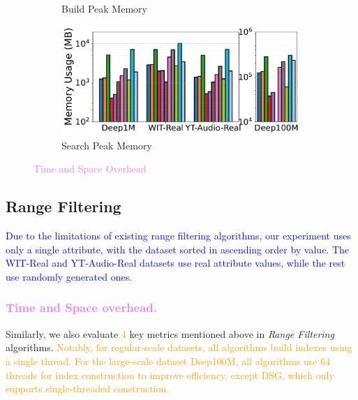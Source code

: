 \documentclass[sigconf, nonacm]{acmart}
\begin{document}
{\begin{figure}[t]
\begin{subfigure}[t]{0.495\columnwidth}
			\caption{\footnotesize Build Peak Memory}
			\label{fig:rangeFilter_build_memory_mb}
		\end{subfigure}
		\hfill
		\begin{subfigure}[t]{0.495\columnwidth}
			\centering
			\includegraphics[width=\linewidth]{figures/searchMem/range_memory_comparison.pdf}
			\caption{\footnotesize Search Peak Memory}
			\label{fig:rangeFilter_search_memory_mb}
		\end{subfigure}
		
		\caption{\textcolor{violet}{Time and Space Overhead}}
		\label{fig:rangeFilter_build_index_comparison}
	\end{figure}
	\subsection{Range Filtering}
	\textcolor{blue}{Due to the limitations of existing range filtering algorithms, our experiment uses only a single attribute, with the dataset sorted in ascending order by value. The WIT-Real and YT-Audio-Real datasets use real attribute values, while the rest use randomly generated ones. }
	\subsubsection{\textcolor{violet}{Time and Space overhead.}}
	
	Similarly, we also evaluate \textcolor{orange}{4} key metrics mentioned above in \textit{Range Filtering} algorithms. \textcolor{orange}{Notably, for regular-scale datasets, all algorithms build indexes using a single thread. For the large-scale dataset Deep100M, all algorithms use 64 threads for index construction to improve efficiency, except DSG, which only supports single-threaded construction.}
	
}
\end{document}
